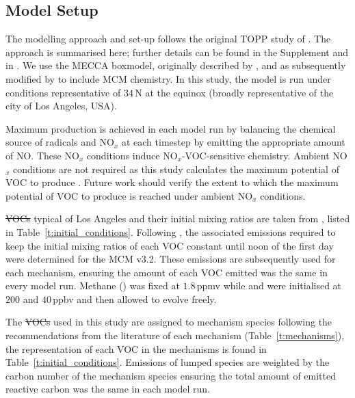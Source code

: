 \documentclass[acpd, online, hvmath]{copernicus}
\providecommand{\DIFadd}[1]{{\protect\color{blue}\uwave{#1}}} %
\providecommand{\DIFdel}[1]{{\protect\color{red}\sout{#1}}}                      %
\providecommand{\DIFaddbegin}{} %
\providecommand{\DIFaddend}{} %
\providecommand{\DIFdelbegin}{} %
\providecommand{\DIFdelend}{} %
\begin{document}
\subsection{Model Setup} \label{ss:model_setup} The modelling approach
and set-up follows the original TOPP study of \citet{Butler:2011}.
The approach is summarised here; further details can be found in the
Supplement and in \citet{Butler:2011}.  We use
the MECCA boxmodel, originally described by \DIFdelbegin %
\DIFdelend \DIFaddbegin \citet{Sander:2005}\DIFaddend , and
as subsequently modified by \citet{Butler:2011} to include MCM
chemistry.  In this study, the model is run under conditions
representative of $34${\degree}\,N at the
equinox (broadly representative of the city of Los Angeles, USA).

Maximum  production is achieved in each model run by
balancing the chemical source of radicals and NO$_{x}$ at each
timestep by emitting the appropriate amount of NO.  These NO$_{x}$
conditions induce NO$_{x}$-VOC-sensitive chemistry.  Ambient
NO$_{x}$ conditions are not required as this study calculates the
maximum potential of VOC to produce .  Future work should
verify the extent to which the maximum potential of VOC to produce
 is reached under ambient NO$_{x}$ conditions.

\DIFdelbegin \DIFdel{VOCs }\DIFdelend \DIFaddbegin \DIFadd{VOC }\DIFaddend typical of Los Angeles and their initial mixing ratios are taken
from \citet{Baker:2008}, listed in Table~\ref{t:initial_conditions}.
Following \citet{Butler:2011}, the associated emissions required to
keep the initial mixing ratios of each VOC constant until noon of the
first day were determined for the MCM v3.2.  These emissions are
subsequently used for each mechanism, ensuring the amount of each VOC
emitted was the same in every model run.  Methane () was
fixed at $1.8$\,\unit{ppmv} while  and  were
initialised at $200$ and $40$\,\unit{ppbv} and then
allowed to evolve freely.

The \DIFdelbegin \DIFdel{VOCs }\DIFdelend \DIFaddbegin \DIFadd{VOC }\DIFaddend used in this study are assigned to mechanism species
following the recommendations from the literature of each mechanism
(Table~\ref{t:mechanisms}), the representation of each VOC in the
mechanisms is found in Table~\ref{t:initial_conditions}.  Emissions of
lumped species are weighted by the carbon number of the mechanism
species ensuring the total amount of emitted reactive carbon was the
same in each model run.
\end{document}
